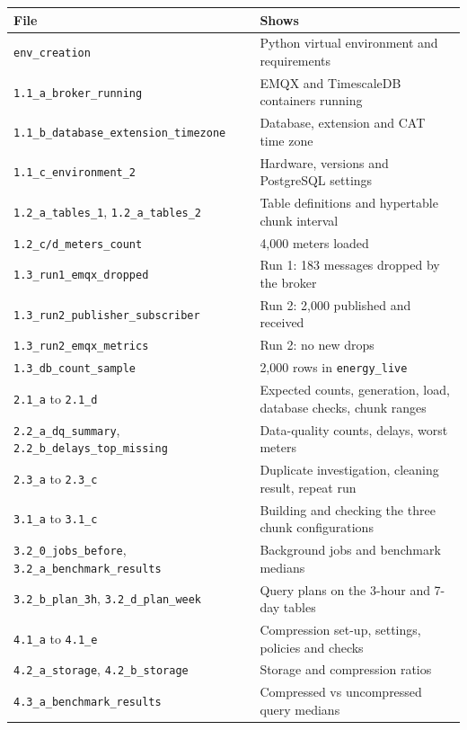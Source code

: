 \documentclass[11pt,a4paper]{article}
\begin{document}
{\small
\begin{longtable}{p{7.4cm}p{7.6cm}}
\toprule
\textbf{File} & \textbf{Shows} \\
\midrule
\endhead
\texttt{env\_creation} & Python virtual environment and requirements \\
\texttt{1.1\_a\_broker\_running} & EMQX and TimescaleDB containers running \\
\texttt{1.1\_b\_database\_extension\_timezone} & Database, extension and CAT time zone \\
\texttt{1.1\_c\_environment\_2} & Hardware, versions and PostgreSQL settings \\
\texttt{1.2\_a\_tables\_1}, \texttt{1.2\_a\_tables\_2} & Table definitions and hypertable chunk interval \\
\texttt{1.2\_c/d\_meters\_count} & 4,000 meters loaded \\
\texttt{1.3\_run1\_emqx\_dropped} & Run 1: 183 messages dropped by the broker \\
\texttt{1.3\_run2\_publisher\_subscriber} & Run 2: 2,000 published and received \\
\texttt{1.3\_run2\_emqx\_metrics} & Run 2: no new drops \\
\texttt{1.3\_db\_count\_sample} & 2,000 rows in \texttt{energy\_live} \\
\texttt{2.1\_a} to \texttt{2.1\_d} & Expected counts, generation, load, database checks, chunk ranges \\
\texttt{2.2\_a\_dq\_summary}, \texttt{2.2\_b\_delays\_top\_missing} & Data-quality counts, delays, worst meters \\
\texttt{2.3\_a} to \texttt{2.3\_c} & Duplicate investigation, cleaning result, repeat run \\
\texttt{3.1\_a} to \texttt{3.1\_c} & Building and checking the three chunk configurations \\
\texttt{3.2\_0\_jobs\_before}, \texttt{3.2\_a\_benchmark\_results} & Background jobs and benchmark medians \\
\texttt{3.2\_b\_plan\_3h}, \texttt{3.2\_d\_plan\_week} & Query plans on the 3-hour and 7-day tables \\
\texttt{4.1\_a} to \texttt{4.1\_e} & Compression set-up, settings, policies and checks \\
\texttt{4.2\_a\_storage}, \texttt{4.2\_b\_storage} & Storage and compression ratios \\
\texttt{4.3\_a\_benchmark\_results} & Compressed vs uncompressed query medians \\

\end{longtable}}
\end{document}

